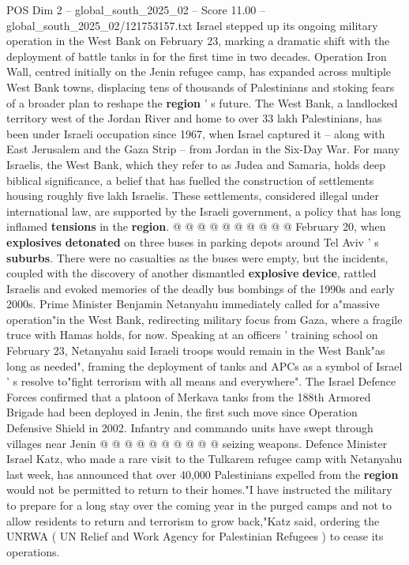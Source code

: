 \begin{textsample}{POS Dim 2 – global\_south\_2025\_02 – Score 11.00 – global\_south\_2025\_02/121753157.txt}  \label{ex:f2_pos_375}
Israel stepped up its ongoing military operation in the West Bank on February 23, marking a dramatic shift with the deployment of battle tanks in for the first time in two decades.
Operation Iron Wall, centred initially on the Jenin refugee camp, has expanded across multiple West Bank towns, displacing tens of thousands of Palestinians and stoking fears of a broader plan to reshape the \textbf{region} ' s future.
The West Bank, a landlocked territory west of the Jordan River and home to over 33 lakh Palestinians, has been under Israeli occupation since 1967, when Israel captured it -- along with East Jerusalem and the Gaza Strip -- from Jordan in the Six-Day War.
For many Israelis, the West Bank, which they refer to as Judea and Samaria, holds deep biblical significance, a belief that has fuelled the construction of settlements housing roughly five lakh Israelis.
These settlements, considered illegal under international law, are supported by the Israeli government, a policy that has long inflamed \textbf{tensions} in the \textbf{region}. @ @ @ @ @ @ @ @ @ @ February 20, when \textbf{explosives} \textbf{detonated} on three buses in parking depots around Tel Aviv ' s \textbf{suburbs}.
There were no casualties as the buses were empty, but the incidents, coupled with the discovery of another dismantled \textbf{explosive} \textbf{device}, rattled Israelis and evoked memories of the deadly bus bombings of the 1990s and early 2000s.
Prime Minister Benjamin Netanyahu immediately called for a"massive operation"in the West Bank, redirecting military focus from Gaza, where a fragile truce with Hamas holds, for now.
Speaking at an officers ' training school on February 23, Netanyahu said Israeli troops would remain in the West Bank"as long as needed", framing the deployment of tanks and APCs as a symbol of Israel ' s resolve to"fight terrorism with all means and everywhere".
The Israel Defence Forces confirmed that a platoon of Merkava tanks from the 188th Armored Brigade had been deployed in Jenin, the first such move since Operation Defensive Shield in 2002.
Infantry and commando units have swept through villages near Jenin @ @ @ @ @ @ @ @ @ @ seizing weapons.
Defence Minister Israel Katz, who made a rare visit to the Tulkarem refugee camp with Netanyahu last week, has announced that over 40,000 Palestinians expelled from the \textbf{region} would not be permitted to return to their homes."I have instructed the military to prepare for a long stay over the coming year in the purged camps and not to allow residents to return and terrorism to grow back,"Katz said, ordering the UNRWA ( UN Relief and Work Agency for Palestinian Refugees ) to cease its operations.

\end{textsample}
